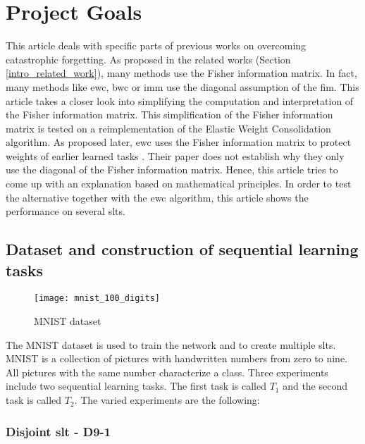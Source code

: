 \section{Project Goals}
\label{project_goals}

This article deals with specific parts of previous works on overcoming catastrophic forgetting.
As proposed in the related works (Section \ref{intro_related_work}), many methods use the Fisher information matrix.
In fact, many methods like \acrshort{ewc}, \acrshort{bwc} or \acrshort{imm} use the diagonal assumption of the \acrshort{fim}.
This article takes a closer look into simplifying the computation and interpretation of the Fisher information matrix.
This simplification of the Fisher information matrix is tested on a reimplementation of the Elastic Weight Consolidation algorithm.
As proposed later, \acrshort{ewc} uses the Fisher information matrix to protect weights of earlier learned tasks \cite{elastic-weight-consolidation}.
Their paper does not establish why they only use the diagonal of the Fisher information matrix.
Hence, this article tries to come up with an explanation based on mathematical principles.
In order to test the alternative together with the \acrshort{ewc} algorithm, this article shows the performance on several \acrlong{slt}s.

\subsection*{Dataset and construction of sequential learning tasks}

\begin{figure}[H]
    \centering
    \texttt{[image: mnist\_100\_digits]}
    \caption{\cite{mnist_examples_image} MNIST dataset}
    \label{fig:intro_mnist_examples}
\end{figure}

The MNIST dataset is used to train the network and to create multiple \acrlong{slt}s.
MNIST is a collection of pictures with handwritten numbers from zero to nine.
All pictures with the same number characterize a class.
\newline
Three experiments include two sequential learning tasks.
The first task is called $T_1$ and the second task is called $T_2$.
The varied experiments are the following:

\subsubsection*{Disjoint \acrshort{slt} - D9-1}

